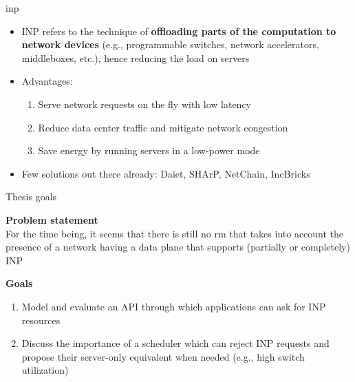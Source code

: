 \begin{frame}[fragile]{\gls*{inp}}

    \setcounter{footnote}{0}

    \begin{itemize}
        \item INP refers to the technique of \textbf{offloading parts of the computation to network devices} (e.g., programmable switches, network accelerators, middleboxes, etc.), hence reducing the load on servers
        \item Advantages:
        \begin{enumerate} %
            \item Serve network requests on the fly with low latency
            \item Reduce data center traffic and mitigate network congestion
            \item Save energy by running servers in a low-power mode
        \end{enumerate}
        \item Few solutions out there already: Daiet\footnotemark{}, SHArP\footnotemark{}, NetChain\footnotemark{}, IncBricks\footnotemark{}
    \end{itemize}

    \setcounter{footnote}{1}
\end{frame}

\begin{frame}[fragile]{Thesis goals}
    
    \textbf{Problem statement}\\
    For the time being, it seems that there is still no \gls*{rm} that takes into account the presence of a network having a data plane that supports (partially or completely) INP

    \vspace{5mm}

    \textbf{Goals}\\
    \begin{enumerate}
        \item Model and evaluate an API through which applications can ask for INP resources
        \item Discuss the importance of a scheduler which can reject INP requests and propose their server-only equivalent when needed (e.g., high switch utilization)
    \end{enumerate}

\end{frame}
